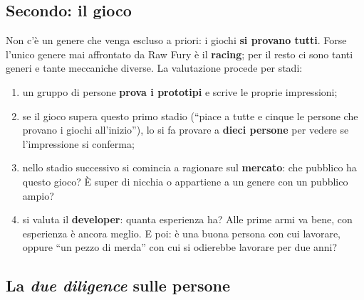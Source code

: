 \subsection{Secondo: il gioco}

Non c'è un genere che venga escluso a priori: i giochi \textbf{si provano
tutti}. Forse l'unico genere mai affrontato da Raw Fury è il \textbf{racing}; per
il resto ci sono tanti generi e tante meccaniche diverse. La valutazione
procede per stadi:
\begin{enumerate}
  \item un gruppo di persone \textbf{prova i prototipi} e scrive le proprie
        impressioni;
  \item se il gioco supera questo primo stadio (``piace a tutte e cinque le
        persone che provano i giochi all'inizio''), lo si fa provare a
        \textbf{dieci persone} per vedere se l'impressione si conferma;
  \item nello stadio successivo si comincia a ragionare sul
        \textbf{mercato}: che pubblico ha questo gioco? È super di nicchia o
        appartiene a un genere con un pubblico ampio?
  \item si valuta il \textbf{developer}: quanta esperienza ha? Alle prime armi
        va bene, con esperienza è ancora meglio. E poi: è una buona persona con
        cui lavorare, oppure ``un pezzo di merda'' con cui si odierebbe lavorare
        per due anni?
\end{enumerate}

\subsection{La \emph{due diligence} sulle persone}

